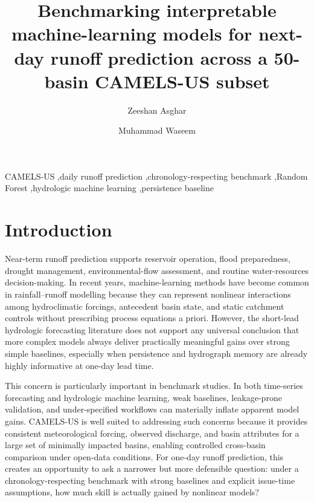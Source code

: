 \documentclass[preprint,12pt,authoryear]{elsarticle}
\begin{document}
\begin{frontmatter}

\title{Benchmarking interpretable machine-learning models for next-day runoff prediction across a 50-basin CAMELS-US subset}

\author[giki]{Zeeshan Asghar}

\author[giki]{Muhammad Waseem}



\begin{abstract}

\end{abstract}

\begin{keyword}
CAMELS-US \sep daily runoff prediction \sep chronology-respecting benchmark \sep Random Forest \sep hydrologic machine learning \sep persistence baseline
\end{keyword}

\end{frontmatter}

\section{Introduction}

Near-term runoff prediction supports reservoir operation, flood preparedness, drought management, environmental-flow assessment, and routine water-resources decision-making. In recent years, machine-learning methods have become common in rainfall--runoff modelling because they can represent nonlinear interactions among hydroclimatic forcings, antecedent basin state, and static catchment controls without prescribing process equations a priori. However, the short-lead hydrologic forecasting literature does not support any universal conclusion that more complex models always deliver practically meaningful gains over strong simple baselines, especially when persistence and hydrograph memory are already highly informative at one-day lead time.

This concern is particularly important in benchmark studies. In both time-series forecasting and hydrologic machine learning, weak baselines, leakage-prone validation, and under-specified workflows can materially inflate apparent model gains. CAMELS-US is well suited to addressing such concerns because it provides consistent meteorological forcing, observed discharge, and basin attributes for a large set of minimally impacted basins, enabling controlled cross-basin comparison under open-data conditions. For one-day runoff prediction, this creates an opportunity to ask a narrower but more defensible question: under a chronology-respecting benchmark with strong baselines and explicit issue-time assumptions, how much skill is actually gained by nonlinear models?
\end{document}
